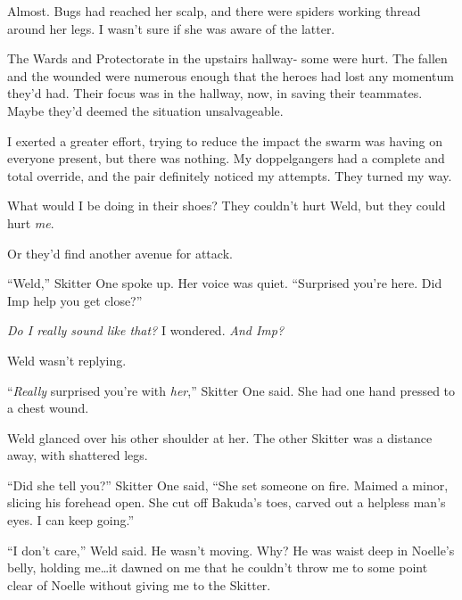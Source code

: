 Almost.  Bugs had reached her scalp, and there were spiders working thread around her legs.  I wasn't sure if she was aware of the latter.



The Wards and Protectorate in the upstairs hallway- some were hurt.  The fallen and the wounded were numerous enough that the heroes had lost any momentum they'd had.  Their focus was in the hallway, now, in saving their teammates.  Maybe they'd deemed the situation unsalvageable.



I exerted a greater effort, trying to reduce the impact the swarm was having on everyone present, but there was nothing.  My doppelgangers had a complete and total override, and the pair definitely noticed my attempts.  They turned my way.



What would I be doing in their shoes?  They couldn't hurt Weld, but they could hurt \emph{me}.



Or they'd find another avenue for attack.



``Weld,'' Skitter One spoke up.  Her voice was quiet.  ``Surprised you're here.  Did Imp help you get close?''



\emph{Do I really sound like that?}  I wondered.  \emph{And Imp?}



Weld wasn't replying.



``\emph{Really} surprised you're with \emph{her},'' Skitter One said.  She had one hand pressed to a chest wound.



Weld glanced over his other shoulder at her.  The other Skitter was a distance away, with shattered legs.



``Did she tell you?'' Skitter One said, ``She set someone on fire.  Maimed a minor, slicing his forehead open.  She cut off Bakuda's toes, carved out a helpless man's eyes.  I can keep going.''



``I don't care,'' Weld said.  He wasn't moving.  Why?  He was waist deep in Noelle's belly, holding me\ldots  it dawned on me that he couldn't throw me to some point clear of Noelle without giving me to the Skitter.



